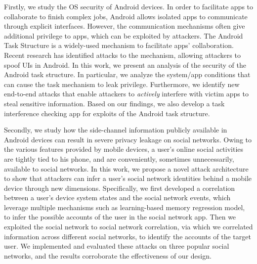 \documentclass[letterpaper,12pt]{article}
\begin{document}
   Firstly, we study the OS security of Android devices. In order to facilitate apps to collaborate to finish complex jobs, Android allows isolated apps to communicate through explicit interfaces. However, the communication mechanisms often give additional privilege to apps, which can be exploited by attackers. The Android Task Structure is a widely-used mechanism to facilitate apps' collaboration. Recent research has identified attacks to the mechanism, allowing attackers to spoof UIs in Android. In this work, we present an analysis of the security of the Android task structure. In particular, we analyze the system/app conditions that can cause the task mechanism to leak privilege. Furthermore, we identify new end-to-end attacks that enable attackers to {\em actively} interfere with victim apps to steal sensitive information. Based on our findings, we also develop a task interference checking app for exploits of the Android task structure.
   
    Secondly, we study how the side-channel information publicly available in Android devices can result in severe privacy leakage on social networks. Owing to the various features provided by mobile devices, a user's online social activities are tightly tied to his phone, and are conveniently, sometimes unnecessarily, available to social networks. In this work, we propose a novel attack architecture to show that attackers can infer a user's social network identities behind a mobile device through new dimensions. Specifically, we first developed a correlation between a user's device system states and the social network events, which leverage multiple mechanisms such as learning-based memory regression model, to infer the possible accounts of the user in the social network app. Then we exploited the social network to social network correlation, via which we correlated information across different social networks, to identify the accounts of the target user. We implemented and evaluated these attacks on three popular social networks, and the results corroborate the effectiveness of our design.
    
\end{document}
